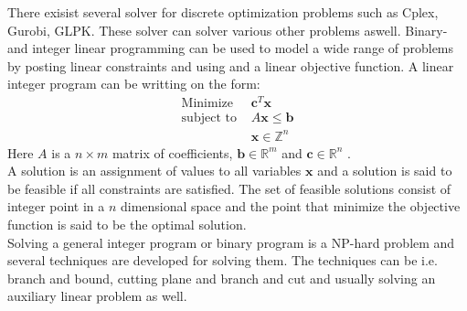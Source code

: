 There exisist several solver for discrete optimization problems such as Cplex, Gurobi, GLPK. These solver can solver 
various other problems aswell. Binary- and integer linear programming can be used to model a wide 
range of problems by posting linear constraints and using and a linear objective function. A linear integer program 
can be writting on the form: 
\begin{align}
 \text{Minimize } & \mathbf{c}^T\mathbf{x} \\ 
 \text{subject to } & A\mathbf{x} \leq \mathbf{b} \\ 
 & \mathbf{x} \in \mathbb{Z}^n
\end{align}
Here $A$ is a $n \times m$ matrix of coefficients, $\mathbf{b} \in \mathbb{R}^m$ and $\mathbf{c} \in 
\mathbb{R}^n$ . \\ 
A solution is an assignment of values to all variables $\mathbf{x}$ and a solution is said to be feasible if all 
constraints are satisfied. The set of feasible solutions consist of integer point in a $n$ dimensional space and the 
point that minimize the objective function is said to be the optimal solution. \\ 
Solving a general integer program or binary program is a NP-hard problem and several techniques are developed for 
solving them. The techniques can be i.e. branch and bound, cutting plane and branch and cut and usually solving an 
auxiliary linear problem as well. \cite[p. 30]{ilp} \\